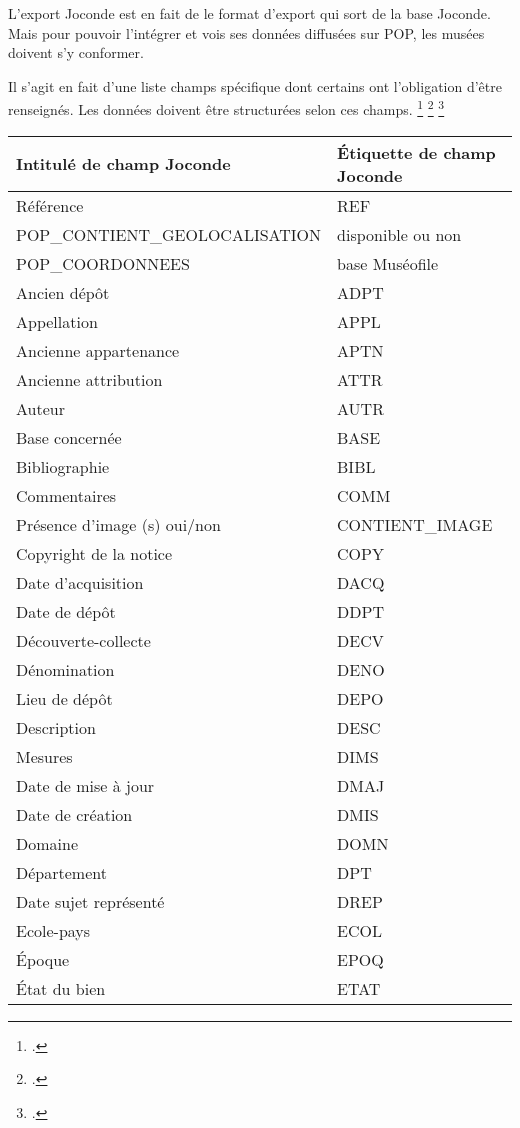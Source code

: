 L'export Joconde est en fait de le format d'export qui sort de la base Joconde. Mais pour pouvoir l'intégrer et vois ses données diffusées sur POP, les musées doivent s'y conformer.\newline

Il s'agit en fait d'une liste champs spécifique dont certains ont l'obligation d'être renseignés. Les données doivent être structurées selon ces champs. \footcite{muséofile} \footcite{base_Joconde} \footcite{Joconde}

\begin{longtable}{|p{7cm}|p{5cm}|}
\hline
\textbf{Intitulé de champ Joconde} & \textbf{Étiquette de champ Joconde} \\
\hline
Référence & REF \\
POP\_CONTIENT\_GEOLOCALISATION & disponible ou non
\\
POP\_COORDONNEES & base Muséofile\\
Ancien dépôt & ADPT \\
Appellation & APPL \\
Ancienne appartenance & APTN \\
Ancienne attribution & ATTR \\
Auteur & AUTR \\
Base concernée & BASE \\
Bibliographie & BIBL \\
Commentaires & COMM \\
Présence d’image (s) oui/non & CONTIENT\_IMAGE \\
Copyright de la notice & COPY \\
Date d’acquisition & DACQ \\
Date de dépôt & DDPT \\
Découverte-collecte & DECV \\
Dénomination & DENO \\
Lieu de dépôt & DEPO \\
Description & DESC \\
Mesures & DIMS \\
Date de mise à jour & DMAJ \\
Date de création & DMIS \\
Domaine & DOMN \\
Département & DPT \\
Date sujet représenté & DREP \\
Ecole-pays & ECOL \\
Époque & EPOQ \\
État du bien & ETAT \\

\end{longtable}
